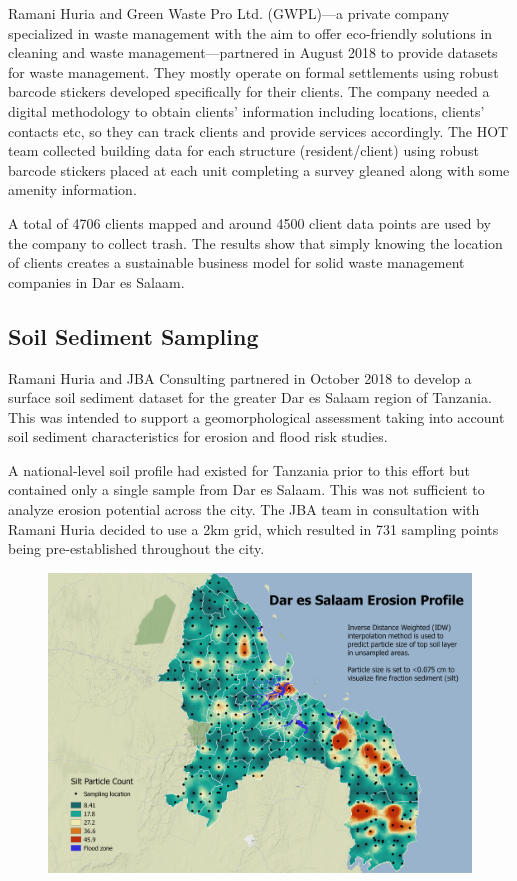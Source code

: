 \documentclass[a4paper,12pt,twoside]{article}
\begin{document}
\begin{multicols}{2}
Ramani Huria and Green Waste Pro Ltd. (GWPL)---a private company specialized in waste management with the aim to offer eco-friendly solutions in cleaning and waste management---partnered in August 2018 to provide datasets for waste management. They mostly operate on formal settlements using robust barcode stickers developed specifically for their clients. The company needed a digital methodology to obtain clients’ information including locations, clients' contacts etc, so they can track clients and provide services accordingly. The HOT team collected building data for each structure (resident/client) using robust barcode stickers placed at each unit completing a survey gleaned along with some amenity information. 

A total of 4706 clients mapped and around 4500 client data points are used by the company to collect trash. The results show that simply knowing the location of clients creates a sustainable business model  for solid waste management companies in Dar es Salaam. 
\end{multicols}

\newpage
\subsection{Soil Sediment Sampling}

\begin{multicols}{2}
Ramani Huria and JBA Consulting partnered in October 2018 to develop a surface soil sediment dataset for the greater Dar es Salaam region of Tanzania. This was intended to support a geomorphological assessment taking into account soil sediment characteristics for erosion and flood risk studies.

A national-level soil profile had existed for Tanzania prior to this effort but contained only a single sample from Dar es Salaam. This was not sufficient to analyze erosion potential across the city. The JBA team in consultation with Ramani Huria decided to use a 2km grid, which resulted in 731 sampling points being pre-established throughout the city.
\end{multicols}

\begin{figure}[h]
    \centering
    \includegraphics[width=.7\textwidth]{images/erosion_Sep26_min.png}
    \label{fig:my_label}
\end{figure}
\end{document}
